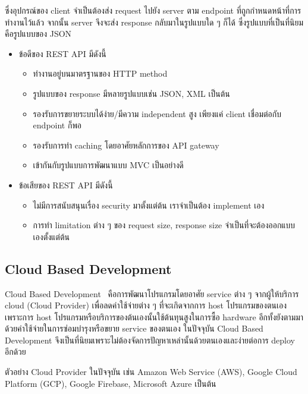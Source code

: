 ซึ่งอุปกรณ์ของ client จำเป็นต้องส่ง request ไปยัง server ตาม endpoint ที่ถูกกำหนดหน้าที่การทำงานไว้แล้ว จากนั้น server จึงจะส่ง response กลับมาในรูปแบบใด ๆ ก็ได้ ซึ่งรูปแบบที่เป็นที่นิยมคือรูปแบบของ JSON

\begin{itemize}
  \item ข้อดีของ REST API มีดังนี้~\cite{rest_vs_soap}
  \begin{itemize}
    \item ทำงานอยู่บนมาตรฐานของ HTTP method
    \item รูปแบบของ response มีหลายรูปแบบเช่น JSON, XML เป็นต้น
    \item รองรับการขยายระบบได้ง่าย/มีความ independent สูง เพียงแค่ client เชื่อมต่อกับ endpoint ก็พอ
    \item รองรับการทำ caching โดยอาศัยหลักการของ API gateway
    \item เข้ากันกับรูปแบบการพัฒนาแบบ MVC เป็นอย่างดี
  \end{itemize}
  \item ข้อเสียของ REST API มีดังนี้
  \begin{itemize}
    \item ไม่มีการสนับสนุนเรื่อง security มาตั้งแต่ต้น เราจำเป็นต้อง implement เอง
    \item การทำ limitation ต่าง ๆ ของ request size, response size จำเป็นที่จะต้องออกแบบเองตั้งแต่ต้น
  \end{itemize}
\end{itemize}

\subsection{Cloud Based Development}
Cloud Based Development~\cite{cloud_dev} คือการพัฒนาโปรแกรมโดยอาศัย service ต่าง ๆ จากผู้ให้บริการ cloud (Cloud Provider) เพื่อลดค่าใช้จ่ายต่าง ๆ ที่จะเกิดจากการ host โปรแกรมของตนเอง เพราะการ host โปรแกรมหรือบริการของต้นเองนั้นใช้ต้นทุนสูงในการซื้อ hardware อีกทั้งยังตามมาด้วยค่าใช้จ่ายในการซ่อมบำรุงหรือขยาย service ของตนเอง ในปัจจุบัน Cloud Based Development จึงเป็นที่นิยมเพราะไม่ต้องจัดการปัญหาเหล่านั้นด้วยตนเองและง่ายต่อการ deploy อีกด้วย

ตัวอย่าง Cloud Provider ในปัจจุบัน เช่น Amazon Web Service (AWS), Google Cloud Platform (GCP), Google Firebase, Microsoft Azure เป็นต้น

